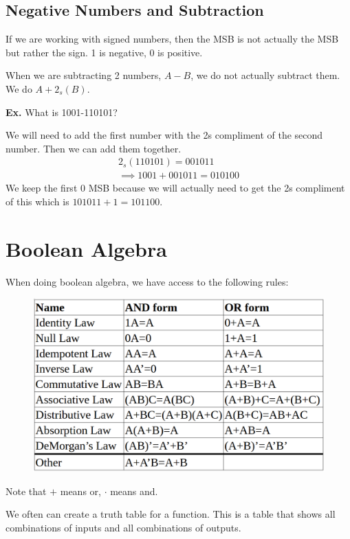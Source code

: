 \documentclass[12pt,letterpaper]{article} \usepackage{amsmath} \usepackage{graphicx}  \usepackage{longtable}  \usepackage{amssymb}
\begin{document}
        \subsection{Negative Numbers and Subtraction}
        If we are working with signed numbers, then the MSB is not actually the MSB but rather the sign. 1 is negative, 0 is positive. 

        When we are subtracting 2 numbers, $A-B$, we do not actually subtract them. We do $A+2_s(B)$. 

        \begin{mdframed}
            \textbf{Ex. } What is 1001-110101?

            We will need to add the first number with the 2s compliment of the second number. Then we can add them together. 
            \begin{align*}
                2_s(110101) = 001011\\
                \implies 1001+001011 = 010100
            \end{align*}
            We keep the first 0 MSB because we will actually need to get the 2s compliment of this which is $101011+1=101100$.
        \end{mdframed}

    \section{Boolean Algebra}
    When doing boolean algebra, we have access to the following rules:
    \begin{figure}[H]
        \centering
        \includegraphics[width=0.6\linewidth]{bol_alg_table.png}
    \end{figure}
    Note that $+$ means or, $\cdot$ means and. 

    We often can create a truth table for a function. This is a table that shows all combinations of inputs and all combinations of outputs.
\end{document}

